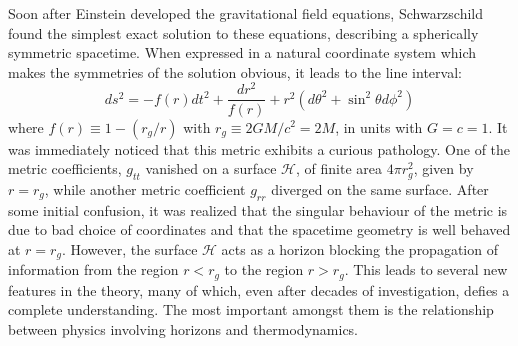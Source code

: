 \documentclass[12pt]{iopart}
\begin{document}
Soon after Einstein developed  the gravitational field equations, Schwarzschild found the simplest
exact solution to these equations, describing a spherically symmetric spacetime. When expressed in a natural coordinate system which makes the symmetries of the solution obvious, it leads to the line interval:
\begin{equation}
ds^2= -f(r)dt^2+\frac{dr^2}{f(r)}+r^2(d\theta^2+\sin^2\theta d\phi^2)
\end{equation} 
where $f(r)\equiv 1-(r_g/r)$ with
$r_g \equiv 2GM/c^2=2M$, in units with $G=c=1$. It was immediately noticed that this metric
exhibits a curious pathology. One of the metric coefficients, $g_{tt}$ 
vanished on a surface $\mathcal{H}$,
of finite area $4\pi r_g^2$, given by  $r=r_g$, while another metric coefficient $g_{rr}$ diverged on the same surface. After some initial confusion, it was realized that
the singular behaviour of the metric is due to bad choice of coordinates and that the spacetime geometry is well behaved at $r=r_g$. However, the surface $\mathcal{H}$ acts as a horizon blocking the propagation of information from the region $r<r_g$ to the region $r>r_g$. This leads to several new features in the theory, many of which, even after decades of investigation, defies a complete understanding. The most important amongst them is the relationship between physics involving horizons and thermodynamics.
\end{document}
